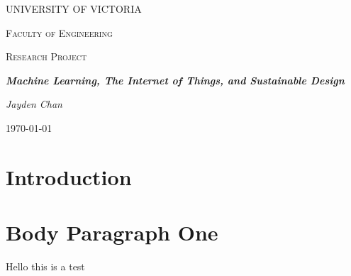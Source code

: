 \documentclass[letterpaper]{article}
\begin{document}
\begin{titlepage}
    \centering
    {\scshape\huge UNIVERSITY OF VICTORIA \par}
    \vspace{1cm}
    {\scshape\LARGE Faculty of Engineering \par}
    \vspace{1cm}
    {\scshape\Large Research Project \par}
    \vspace{1.5cm}
    {\huge\bfseries \emph{Machine Learning, The Internet of Things, and Sustainable Design} \par}
    \vspace{2cm}
    {\Large\itshape Jayden Chan \par}
    \vfill
    {\large \today\par}
\end{titlepage}
\pagestyle{pageOne}

\section{Introduction}
\blindtext
\section{Body Paragraph One}
\blindtext
\blindtext
\blindtext

Hello this is a test \textcite{perisic17}
\pagestyle{normalPage}


\printbibliography
\end{document}
